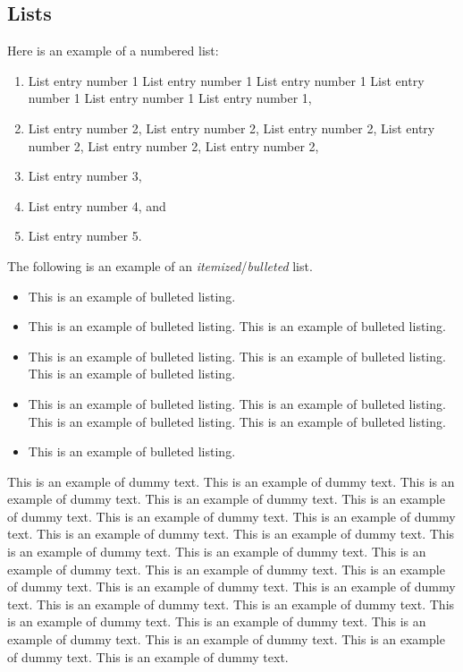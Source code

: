 \documentclass{aer}      %
\begin{document}
\subsection{Lists} Here is an example of a numbered list:
\begin{enumerate}
\item List entry number 1 List entry number 1 List entry number 1 List entry number 1 List entry number 1 List entry number 1,
\item List entry number 2, List entry number 2, List entry number 2, List entry number 2, List entry number 2, List entry number 2,
\item List entry number 3,
\item List entry number 4, and
\item List entry number 5.
\end{enumerate}

The following is an example of an \emph{itemized}/\emph{bulleted}
list.

\begin{itemize}
\item This is an example of bulleted listing.
\item This is an example of bulleted listing. This is an example of bulleted listing.
\item This is an example of bulleted listing.  This is an example of bulleted listing. This is an example of bulleted listing.
\item This is an example of bulleted listing. This is an example of bulleted listing. This is an example of bulleted listing. This is an example of bulleted listing.
\item This is an example of bulleted listing.
\end{itemize}

This is an example of dummy text. This is an example of dummy text. This is an example of dummy text. This is an example of dummy text. This is an example of dummy text. This is an example of dummy text. This is an example of dummy text. This is an example of dummy text. This is an example of dummy text. This is an example of dummy text. This is an example of dummy text. This is an example of dummy text. This is an example of dummy text. This is an example of dummy text. This is an example of dummy text. This is an example of dummy text. This is an example of dummy text. This is an example of dummy text. This is an example of dummy text. This is an example of dummy text. This is an example of dummy text. This is an example of dummy text. This is an example of dummy text. This is an example of dummy text.
\end{document}
